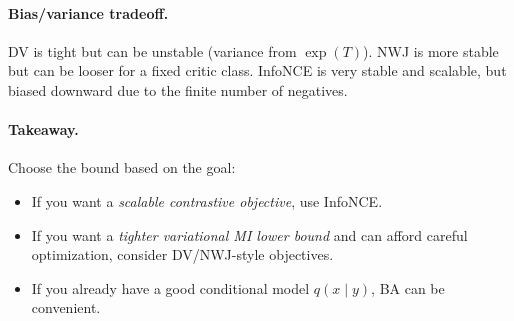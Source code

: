 \paragraph{Bias/variance tradeoff.}
DV is tight but can be unstable (variance from $\exp(T)$).
NWJ is more stable but can be looser for a fixed critic class.
InfoNCE is very stable and scalable, but biased downward due to the finite number of negatives.

\paragraph{Takeaway.}
Choose the bound based on the goal:
\begin{itemize}[leftmargin=2em]
    \item If you want a \emph{scalable contrastive objective}, use InfoNCE.
    \item If you want a \emph{tighter variational MI lower bound} and can afford careful optimization, consider DV/NWJ-style objectives.
    \item If you already have a good conditional model $q(x\mid y)$, BA can be convenient.
\end{itemize}
